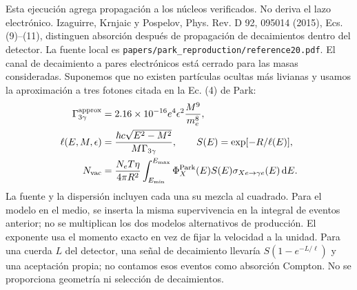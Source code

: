 \section{}
{Esta ejecución agrega propagación a los núcleos verificados. No deriva el lazo electrónico. Izaguirre, Krnjaic y Pospelov, Phys. Rev. D 92, 095014 (2015), Ecs. (9)--(11), distinguen absorción después de propagación de decaimientos dentro del detector. La fuente local es \texttt{papers/park\_reproduction/reference20.pdf}. El canal de decaimiento a pares electrónicos está cerrado para las masas consideradas. Suponemos que no existen partículas ocultas más livianas y usamos la aproximación a tres fotones citada en la Ec. (4) de Park:}
\begin{align}
\Gamma_{3\gamma}^{\rm approx}&=2.16\times10^{-16}e^4\epsilon^2\frac{M^9}{m_e^8},\\
\ell(E,M,\epsilon)&=\frac{\hbar c\sqrt{E^2-M^2}}{M\Gamma_{3\gamma}},\qquad S(E)=\exp[-R/\ell(E)],\\
N_{\rm vac}&=\frac{N_eT\eta}{4\pi R^2}\int_{E_{\min}}^{E_{\max}}\Phi_X^{\rm Park}(E)S(E)\sigma_{Xe\to\gamma e}(E)\,\mathrm{d} E.
\end{align}
{La fuente y la dispersión incluyen cada una su mezcla al cuadrado. Para el modelo en el medio, se inserta la misma supervivencia en la integral de eventos anterior; no se multiplican los dos modelos alternativos de producción. El exponente usa el momento exacto en vez de fijar la velocidad a la unidad. Para una cuerda $L$ del detector, una señal de decaimiento llevaría $S(1-e^{-L/\ell})$ y una aceptación propia; no contamos esos eventos como absorción Compton. No se proporciona geometría ni selección de decaimientos.}

